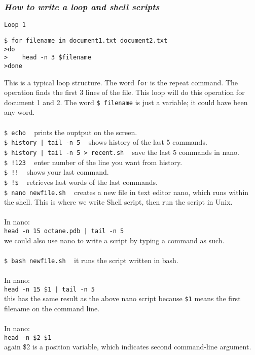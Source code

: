 \documentclass{article}
\begin{document}
\subsubsection{\small\textsl{How to write a loop and shell scripts }}
\texttt{Loop 1}
\begin{lstlisting}
$ for filename in document1.txt document2.txt
>do
>    head -n 3 $filename
>done
\end{lstlisting}
This is a typical loop structure. The word \texttt{for} is the repeat command. The operation finds the first 3 lines of the file. This loop will do this operation for document 1 and 2. The word \texttt{\$ filename} is just a variable; it could have been any word.\\
\\
\texttt{\$ echo} ~ prints the ouptput on the screen.\\
\texttt{\$ history | tail -n 5} ~ shows history of the last 5 commands.\\
\texttt{\$ history | tail -n 5 > recent.sh} ~ save the last 5 commands in nano.\\
\texttt{\$ !123} ~ enter number of the line you want from history. \\
\texttt{\$ !!} ~ shows your last command.\\
\texttt{\$ !\$} ~ retrieves last words of the last commands.\\
\texttt{\$ nano newfile.sh} ~ creates a new file in text editor nano, which runs within the shell. This is where we write Shell script, then run the script in Unix.\\
\\
In nano:\\ 
\indent\texttt{head -n 15 octane.pdb | tail -n 5}\\
\indent we could also use nano to write a script by typing a command as such. \\
\\
\texttt{\$ bash newfile.sh} ~ it runs the script written in bash.\\
\\
In nano:\\
\indent\texttt{head -n 15 \$1 | tail -n 5}\\
\indent this has the same result as the above nano script because \texttt{\$1} means the first filename on the command line. \\
\\
In nano:\\
\indent \texttt{head -n \$2 \$1}\\
\indent again \$2 is a position variable, which indicates second command-line argument.\\
\end{document}
